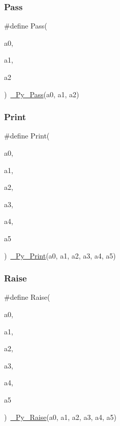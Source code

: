 \mbox{\label{_python-ast_8h_aee98f791da192bec0e50ed774c9f141f}} 
\subsubsection{\texorpdfstring{Pass}{Pass}}
{\footnotesize\ttfamily \#define Pass(\begin{DoxyParamCaption}\item[{}]{a0,  }\item[{}]{a1,  }\item[{}]{a2 }\end{DoxyParamCaption})~\mbox{\hyperlink{_python-ast_8h_afa9885f0b471f7e1a640ac82c9be090f}{\+\_\+\+Py\+\_\+\+Pass}}(a0, a1, a2)}

\mbox{\label{_python-ast_8h_a6e4d6b1145275e9c1d89c9aa5b778546}} 
\subsubsection{\texorpdfstring{Print}{Print}}
{\footnotesize\ttfamily \#define Print(\begin{DoxyParamCaption}\item[{}]{a0,  }\item[{}]{a1,  }\item[{}]{a2,  }\item[{}]{a3,  }\item[{}]{a4,  }\item[{}]{a5 }\end{DoxyParamCaption})~\mbox{\hyperlink{_python-ast_8h_ab5588d69d529b0cf9ef93fe25435f521}{\+\_\+\+Py\+\_\+\+Print}}(a0, a1, a2, a3, a4, a5)}

\mbox{\label{_python-ast_8h_a848cb93d9dbab05992a08c7e6b50fc74}} 
\subsubsection{\texorpdfstring{Raise}{Raise}}
{\footnotesize\ttfamily \#define Raise(\begin{DoxyParamCaption}\item[{}]{a0,  }\item[{}]{a1,  }\item[{}]{a2,  }\item[{}]{a3,  }\item[{}]{a4,  }\item[{}]{a5 }\end{DoxyParamCaption})~\mbox{\hyperlink{_python-ast_8h_adfc8c2a87f1fe7625435a22b28d1fc7f}{\+\_\+\+Py\+\_\+\+Raise}}(a0, a1, a2, a3, a4, a5)}

